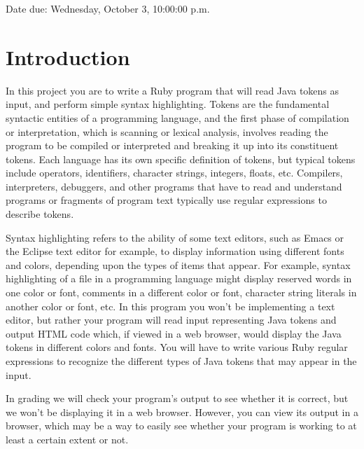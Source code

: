 \documentclass[11pt]{article}
\begin{document}

  \vspace{-2mm}

  \begin{centering}

    Date due: Wednesday, October 3, 10:00:00 p.m.

  \end{centering}

  \vspace{-3.5mm}


  \section{Introduction}

    In this project you are to write a Ruby program that will read Java tokens
  as input, and perform simple syntax highlighting.  Tokens are the
  fundamental syntactic entities of a programming language, and the first
  phase of compilation or interpretation, which is scanning or lexical
  analysis, involves reading the program to be compiled or interpreted and
  breaking it up into its constituent tokens.  Each language has its own
  specific definition of tokens, but typical tokens include operators,
  identifiers, character strings, integers, floats, etc.  Compilers,
  interpreters, debuggers, and other programs that have to read and
  understand programs or fragments of program text typically use regular
  expressions to describe tokens.

    Syntax highlighting refers to the ability of some text editors, such as
  Emacs or the Eclipse text editor for example, to display information using
  different fonts and colors, depending upon the types of items that appear.
  For example, syntax highlighting of a file in a programming language might
  display reserved words in one color or font, comments in a different color
  or font, character string literals in another color or font, etc.  In this
  program you won't be implementing a text editor, but rather your program
  will read input representing Java tokens and output HTML code which, if
  viewed in a web browser, would display the Java tokens in different colors
  and fonts.  You will have to write various Ruby regular expressions to
  recognize the different types of Java tokens that may appear in the input.

    In grading we will check your program's output to see whether it is
  correct, but we won't be displaying it in a web browser.  However, you can
  view its output in a browser, which may be a way to easily see whether
  your program is working to at least a certain extent or not.
\end{document}
